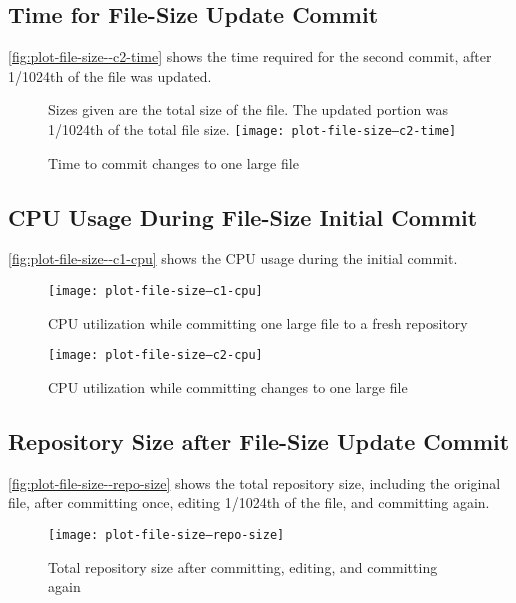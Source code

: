 \subsection{Time for File-Size Update Commit}

\autoref{fig:plot-file-size--c2-time} shows the time required for the second
commit, after \num{1/1024}th of the file was updated.


\begin{figure}[]
    \caption{Time to commit changes to one large file}
    \label{fig:plot-file-size--c2-time}
    \centering
    Sizes given are the total size of the file. The updated portion was
    \num{1/1024}th of the total file size.
    \texttt{[image: plot-file-size--c2-time]}
\end{figure}


\subsection{CPU Usage During File-Size Initial Commit}

\autoref{fig:plot-file-size--c1-cpu} shows the
CPU usage during the initial commit.

\begin{figure}[]
  \caption{CPU utilization while committing one large file to a fresh repository}
  \label{fig:plot-file-size--c1-cpu}
  \centering
    \texttt{[image: plot-file-size--c1-cpu]}
\end{figure}


\begin{figure}[]
  \caption{CPU utilization while committing changes to one large file}
  \label{fig:plot-file-size--c2-cpu}
  \centering
    \texttt{[image: plot-file-size--c2-cpu]}
\end{figure}


\subsection{Repository Size after File-Size Update Commit}

\autoref{fig:plot-file-size--repo-size} shows the total
repository size, including the original file, after committing once, editing
1/1024th of the file, and committing again.


\begin{figure}[]
  \caption{Total repository size after committing, editing, and committing again}
  \label{fig:plot-file-size--repo-size}
  \centering
    \texttt{[image: plot-file-size--repo-size]}
\end{figure}

